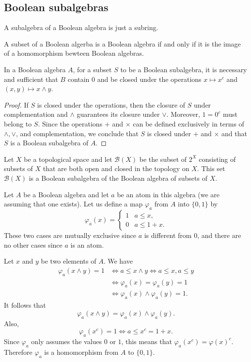 \subsection{Boolean subalgebras}
\begin{definition}
A subalgebra of a Boolean algebra is just a subring.
\end{definition}
\begin{proposition}
A subset of a Boolean algerba is a Boolean algebra if and only if it is the image of a homomorphism bewteen Boolean algebras.
\end{proposition}
\begin{theorem}\label{Bool ring subalg iff}
In a Boolean algebra $A$, for a subset $S$ to be a Boolean subalgebra, it is necessary and sufficient that $B$ contain $0$ and 
be closed under the operations $x\mapsto x^c$ and $(x,y)\mapsto x\wedge y$.
\end{theorem}
\begin{proof}
If $S$ is closed under the  operations, then the closure of $S$ under complementation and $\wedge$ guarantees its closure under $\vee$. 
Moreover, $1=0^c$ must belong to $S$. Since the operations $+$ and $\times$ can be defined exclusively in terms of $\wedge,\vee$, and 
complementation, we conclude that $S$ is closed under $+$ and $\times$ and that $S$ is a Boolean subalgebra of $A$.
\end{proof}
\begin{example}
Let $X$ be a topological space and let $\mathcal{B}(X)$ be the subset of $2^X$ consisting of subsets of $X$ 
that are both open and closed in the topology on $X$. This set $\mathcal{B}(X)$ is a Boolean subalgebra of 
the Boolean algebra of subsets of $X$.
\end{example}
\begin{example}
Let $A$ be a Boolean algebra and let $a$ be an atom in this algebra (we are assuming that one exists). Let us define 
a map $\varphi_a$ from $A$ into $\{0,1\}$ by
\[\varphi_a(x)=\begin{cases}
1&a\leq x,\\
0&a\leq 1+x.
\end{cases}\]
These two cases are mutually exclusive since $a$ is different from $0$, and there are no other cases since $a$ is an atom.\par
Let $x$ and $y$ be two elements of $A$. We have 
\begin{align*}
\varphi_a(x\wedge y)=1&\iff a\leq x\wedge y\iff a\leq x,a\leq y\\
&\iff \varphi_a(x)=\varphi_a(y)=1\\
&\iff \varphi_a(x)\wedge\varphi_a(y)=1.
\end{align*}
It follows that
\[\varphi_a(x\wedge y)=\varphi_a(x)\wedge\varphi_a(y).\]
Also,
\[\varphi_a(x^c)=1\iff a\leq x^c=1+x.\]
Since $\varphi_a$ only assumes the values $0$ or $1$, this means that $\varphi_a(x^c)=\varphi(x)^c$. Therefore $\varphi_a$ is a homomorphism from $A$ to $\{0,1\}$.
\end{example}
